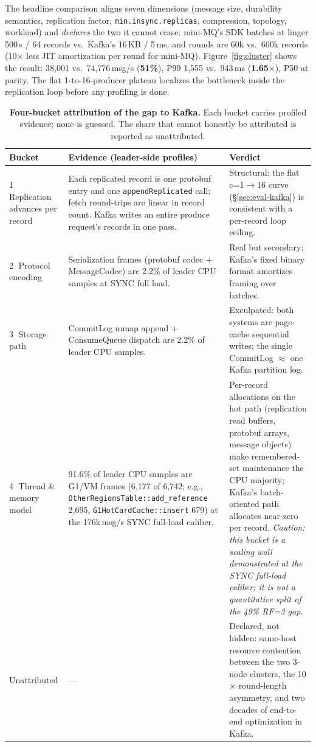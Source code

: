 \documentclass[letterpaper,twocolumn,10pt]{article}
\begin{document}
The headline comparison aligns seven dimensions (message size,
durability semantics, replication factor, \texttt{min.insync.replicas},
compression, topology, workload) and \emph{declares} the two it cannot
erase: mini-MQ's SDK batches at linger 500\,\textmu s / 64 records vs.\
Kafka's 16\,KB / 5\,ms, and rounds are 60k vs.\ 600k records (10$\times$
less JIT amortization per round for mini-MQ). Figure~\ref{fig:cluster}
shows the result: 38{,}001 vs.\ 74{,}776\,msg/s
(\textbf{51\%}), P99 1{,}555 vs.\ 943\,ms (\textbf{1.65$\times$}), P50
at parity. The flat 1-to-16-producer plateau localizes the bottleneck
inside the replication loop before any profiling is done.

\begin{table}[t]
\centering
\small
\begin{tabular}{lp{}p{}}
\toprule
Bucket & Evidence (leader-side profiles) & Verdict \\
\midrule
\textcircled{1} Replication advances per record &
Each replicated record is one protobuf entry and one
\texttt{appendReplicated} call; fetch round-trips are linear in record
count. Kafka writes an entire produce request's records in one pass. &
Structural: the flat c=1$\rightarrow$16 curve (\S\ref{sec:eval-kafka})
is consistent with a per-record loop ceiling. \\
\textcircled{2} Protocol encoding &
Serialization frames (protobuf codec + MessageCodec) are 2.2\% of leader
CPU samples at SYNC full load. &
Real but secondary; Kafka's fixed binary format amortizes framing over
batches. \\
\textcircled{3} Storage path &
CommitLog mmap append + ConsumeQueue dispatch are 2.2\% of leader CPU
samples. &
Exculpated: both systems are page-cache sequential writes; the single
CommitLog $\approx$ one Kafka partition log. \\
\textcircled{4} Thread \& memory model &
91.6\% of leader CPU samples are G1/VM frames (6{,}177 of 6{,}742;
e.g., \texttt{OtherRegionsTable::add\_reference} 2{,}695,
\texttt{G1HotCardCache::insert} 679) at the 176k\,msg/s SYNC full-load
caliber. &
Per-record allocations on the hot path (replication read buffers,
protobuf arrays, message objects) make remembered-set maintenance the
CPU majority; Kafka's batch-oriented path allocates near-zero per record.
\emph{Caution: this bucket is a scaling wall demonstrated at the SYNC
full-load caliber; it is not a quantitative split of the 49\% RF=3
gap.} \\
\midrule
Unattributed & --- &
Declared, not hidden: same-host resource contention between the two
3-node clusters, the 10$\times$ round-length asymmetry, and two decades
of end-to-end optimization in Kafka. \\
\bottomrule
\end{tabular}
\caption{\textbf{Four-bucket attribution of the gap to Kafka.} Each
bucket carries profiled evidence; none is guessed. The share that
cannot honestly be attributed is reported as unattributed.}
\label{tab:buckets}
\end{table}
\end{document}
